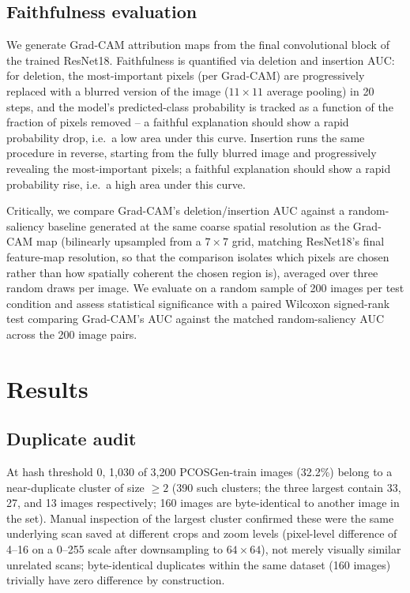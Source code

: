 \documentclass[conference]{IEEEtran}
\begin{document}
\subsection{Faithfulness evaluation}

We generate Grad-CAM attribution maps from the final convolutional block of the trained ResNet18. Faithfulness is quantified via deletion and insertion AUC: for deletion, the most-important pixels (per Grad-CAM) are progressively replaced with a blurred version of the image ($11\times11$ average pooling) in 20 steps, and the model's predicted-class probability is tracked as a function of the fraction of pixels removed -- a faithful explanation should show a rapid probability drop, i.e.\ a low area under this curve. Insertion runs the same procedure in reverse, starting from the fully blurred image and progressively revealing the most-important pixels; a faithful explanation should show a rapid probability rise, i.e.\ a high area under this curve.

Critically, we compare Grad-CAM's deletion/insertion AUC against a random-saliency baseline generated at the same coarse spatial resolution as the Grad-CAM map (bilinearly upsampled from a $7\times7$ grid, matching ResNet18's final feature-map resolution, so that the comparison isolates which pixels are chosen rather than how spatially coherent the chosen region is), averaged over three random draws per image. We evaluate on a random sample of 200 images per test condition and assess statistical significance with a paired Wilcoxon signed-rank test comparing Grad-CAM's AUC against the matched random-saliency AUC across the 200 image pairs.

\section{Results}

\subsection{Duplicate audit}

At hash threshold 0, 1,030 of 3,200 PCOSGen-train images (32.2\%) belong to a near-duplicate cluster of size $\geq 2$ (390 such clusters; the three largest contain 33, 27, and 13 images respectively; 160 images are byte-identical to another image in the set). Manual inspection of the largest cluster confirmed these were the same underlying scan saved at different crops and zoom levels (pixel-level difference of 4--16 on a 0--255 scale after downsampling to $64\times64$), not merely visually similar unrelated scans; byte-identical duplicates within the same dataset (160 images) trivially have zero difference by construction.
\end{document}
